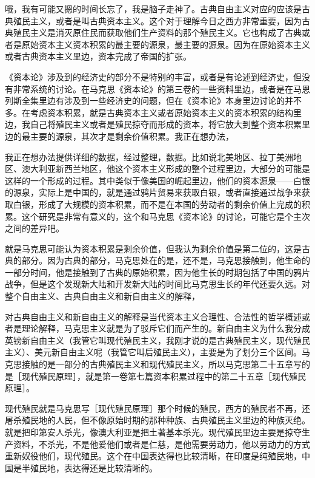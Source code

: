 \documentclass[UTF8, 12pt, a4paper]{ctexrep}
\begin{document}
哦，我有可能又摁的时间长忘了，我是脑子走神了。古典自由主义对应的应该是古典殖民主义，或者是叫古典资本主义。这个对于理解今日之西方非常重要，因为古典殖民主义是消灭原住民而获取他们生产资料的那个殖民主义。它也构成了古典或者是原始资本主义资本积累的最主要的源泉，最主要的源泉。因为在原始资本主义或者古典资本主义里边，资本完成了帝国的扩张。

《资本论》涉及到的经济史的部分不是特别的丰富，或者是有论述到经济史，但没有非常系统的讨论。在马克思《资本论》的第三卷的一些资料里边，或者是在马恩列斯全集里边有涉及到一些经济史的问题，但在《资本论》本身里边讨论的并不多。在考虑资本积累，就是古典资本主义或者原始资本主义的资本积累的结构里边，我自己将殖民主义或者是殖民掠夺而形成的资本，将它放大到整个资本积累里边的最主要的源泉，其次才是剩余价值积累。我正在想办法，

我正在想办法提供详细的数据，经过整理，数据。比如说北美地区、拉丁美洲地区、澳大利亚新西兰地区，他这个资本主义形成的整个过程里边，大部分的可能是这样的一个形成的过程。其中类似于像美国的崛起里边，他们的资本源泉——白银的源泉，实际上是中国的，就是通过鸦片贸易来获取白银，或者直接通过战争来获取白银，形成了大规模的资本积累，而不是在本国的劳动者的剩余价值上完成的积累。这个研究是非常有意义的，这个和马克思《资本论》的讨论，可能它是个主次之间的差异吧。

就是马克思可能认为资本积累是剩余价值，但我认为剩余价值是第二位的，这是古典的部分。因为古典的部分，马克思处在的是，还不是，马克思接触到，他生命的一部分时间，他是接触到了古典的原始积累，因为他生长的时期包括了中国的鸦片战争，但是这个发现新大陆和开发新大陆的时间比马克思生长的年代还要久远。对整个自由主义、古典自由主义和新自由主义的解释，

对古典自由主义和新自由主义的解释是当代资本主义合理性、合法性的哲学概述或者是理论解释，马克思主义就是为了驳斥它们而产生的。新自由主义为什么我分成英镑新自由主义（我管它叫现代殖民主义，我刚才说的是古典殖民主义，现代殖民主义）、美元新自由主义呢（我管它叫后殖民主义），主要是为了划分三个区间。马克思接触的是一部分的古典殖民主义和现代殖民主义，所以马克思第二十五章写的是［现代殖民原理］，就是第一卷第七篇资本积累过程中的第二十五章［现代殖民原理］。

现代殖民就是马克思写［现代殖民原理］那个时候的殖民，西方的殖民者不再，还屠杀殖民地的人民，但不像原始时期的那种种族、古典殖民主义里边的种族灭绝。就是把印第安人杀光，像澳大利亚是把土著基本杀光。现代殖民里边主要是掠夺生产资料，不杀光，不是他爱他们或者是仁慈，是他需要劳动力，他以劳动力的方式重新奴役他们，现代殖民。这个在中国表达得也比较清晰，在印度是纯殖民地，中国是半殖民地，表达得还是比较清晰的。
\end{document}
